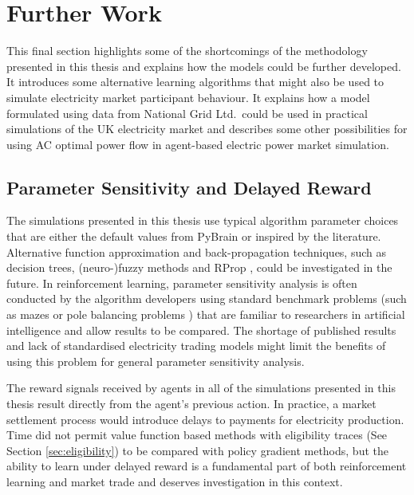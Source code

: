 \section{Further Work}
\label{sec:furtherwork}
This final section highlights some of the shortcomings of the methodology
presented in this thesis and explains how the models could be further developed.
It introduces some alternative learning algorithms that might also be used to
simulate electricity market participant behaviour.
It explains how a model formulated using data from National Grid Ltd.~could be
used in practical simulations of the UK electricity market and describes some
other possibilities for using AC optimal power flow in agent-based electric
power market simulation.

\subsection{Parameter Sensitivity and Delayed Reward}
The simulations presented in this thesis use typical algorithm parameter choices
that are either the default values from PyBrain or inspired by the literature.
Alternative function approximation and back-propagation techniques, such as
decision trees, (neuro-)fuzzy methods \cite{jang93anfis} and RProp
\cite{riedmiller93}, could be investigated in the future. In reinforcement
learning, parameter sensitivity analysis is often conducted by the algorithm
developers using standard benchmark problems (such as mazes or pole balancing
problems \cite{schaul:2010}) that are familiar to researchers in artificial
intelligence and allow results to be compared. The shortage of published results
and lack of standardised electricity trading models might limit the benefits of
using this problem for general parameter sensitivity analysis.

The reward signals received by agents in all of the simulations presented in
this thesis result directly from the agent's previous action.  In
practice, a market settlement process would introduce delays to payments for
electricity production. Time did not permit value function based methods with
eligibility traces (See Section \ref{sec:eligibility}) to be compared with
policy gradient methods, but the ability to learn under delayed reward is a
fundamental part of both reinforcement learning and market trade and deserves
investigation in this context.

